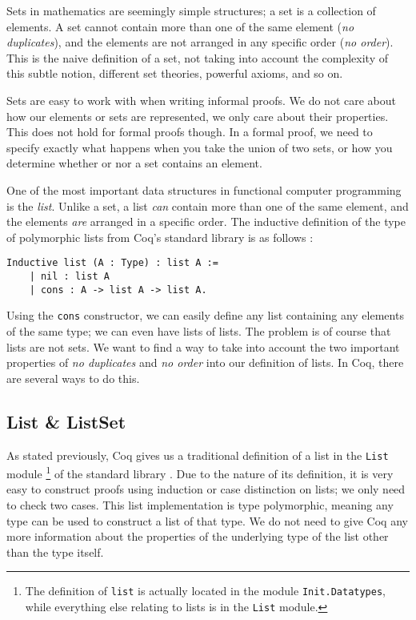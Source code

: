 Sets in mathematics are seemingly simple structures; a set is a collection of elements.
A set cannot contain more than one of the same element (\emph{no duplicates}), and the elements are not arranged in any
specific order (\emph{no order}).
This is the naive definition of a set, not taking into account the complexity of this subtle notion,
different set theories, powerful axioms, and so on.

Sets are easy to work with when writing informal proofs.
We do not care about how our elements or sets are represented, we only care about their properties.
This does not hold for formal proofs though. In a formal proof, we need to specify exactly what happens
when you take the union of two sets, or how you determine whether or nor a set contains an element.

One of the most important data structures in functional computer programming is the \emph{list}.
Unlike a set, a list \emph{can} contain more than one of the same element, and the elements \emph{are} arranged in a
specific order.
The inductive definition of the type of polymorphic lists from Coq's standard library is as follows \cite{coqdatatypes}:

\begin{minipage}{\linewidth}
\begin{lstlisting}[language=Coq, label={lst:list_def}, caption={Inductive definition of the list type in Coq}]
Inductive list (A : Type) : list A :=
    | nil : list A
    | cons : A -> list A -> list A.
\end{lstlisting}
\end{minipage}

Using the \lstinline{cons} constructor, we can easily define any list containing any elements of the same type;
we can even have lists of lists.
The problem is of course that lists are not sets. We want to find a way to take into account the two important properties
of \emph{no duplicates} and \emph{no order} into our definition of lists.
In Coq, there are several ways to do this.

\subsection{List \& ListSet}
\label{ssec:list_listset}

As stated previously, Coq gives us a traditional definition of a list in the \lstinline{List} module
\footnote{The definition of \lstinline{list} is actually located in the module \lstinline{Init.Datatypes},
while everything else relating to lists is in the \lstinline{List} module.} of the standard library \cite{coqlist}.
Due to the nature of its definition, it is very easy to construct proofs using induction or case distinction on lists;
we only need to check two cases.
This list implementation is type polymorphic, meaning any type can be used to construct a list of that type.
We do not need to give Coq any more information about the properties of the underlying type of the list other than the type itself.

